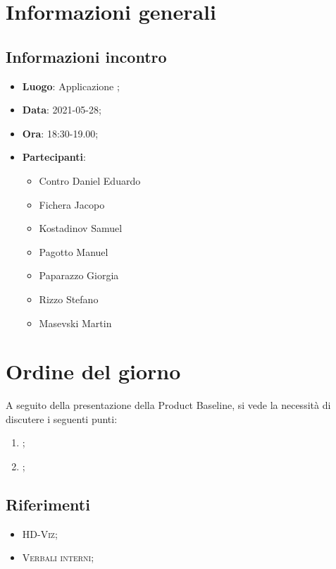 \documentclass{article}
\begin{document}


\section{Informazioni generali}
\label{sec:info_generali}

\subsection{Informazioni incontro}
\label{sub:info_incontro}

\begin{itemize}
	\item \textbf{Luogo}: Applicazione ;
	\item \textbf{Data}: 2021-05-28;
	\item \textbf{Ora}: 18:30-19.00;
	\item \textbf{Partecipanti}:
	\begin{itemize}
		\item Contro Daniel Eduardo
		\item Fichera Jacopo
		\item Kostadinov Samuel
        \item Pagotto Manuel
		\item Paparazzo Giorgia
		\item Rizzo Stefano
		\item Masevski Martin
	\end{itemize}
\end{itemize}

\section{Ordine del giorno}%
\label{sec:ordine_del_giorno}
A seguito della presentazione della Product Baseline, si vede la necessità di discutere i seguenti punti:
\begin{enumerate}
	\item {};
	\item {};
\end{enumerate}


\subsection{Riferimenti}%
\label{sub:riferimenti}
\begin{itemize}
    \item \textsc{HD-Viz};
    \item \textsc{Verbali interni};
    \end{itemize}
\end{document}
